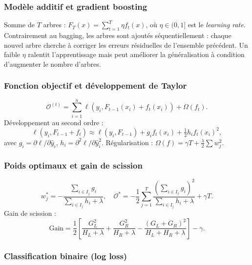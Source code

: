 \documentclass[12pt,a4paper]{report}
\begin{document}
\subsubsection{Modèle additif et gradient boosting}

Somme de $T$ arbres : $F_T(x)=\sum_{t=1}^{T}\eta f_t(x)$, où $\eta\in(0,1]$ est le
\emph{learning rate}. Contrairement au bagging, les arbres sont ajoutés séquentiellement :
chaque nouvel arbre cherche à corriger les erreurs résiduelles de l'ensemble précédent.
Un faible $\eta$ ralentit l'apprentissage mais peut améliorer la généralisation à condition
d'augmenter le nombre d'arbres.

\subsubsection{Fonction objectif et développement de Taylor}

\begin{equation}
 \mathcal{O}^{(t)} = \sum_{i=1}^n
 \ell(y_i, F_{t-1}(x_i) + f_t(x_i)) + \Omega(f_t).
\end{equation}
Développement au second ordre :
\begin{equation}
 \ell(y_i, F_{t-1} + f_t) \approx
 \ell(y_i, F_{t-1}) + g_i f_t(x_i) + \tfrac{1}{2} h_i f_t(x_i)^2,
\end{equation}
avec $g_i = \partial \ell/\partial \hat{y}_i$, $h_i = \partial^2 \ell/\partial \hat{y}_i^2$.
Régularisation : $\Omega(f) = \gamma T + \frac{\lambda}{2}\sum w_j^2$.

\subsubsection{Poids optimaux et gain de scission}

\begin{equation}
 w_j^* = -\frac{\sum_{i \in I_j} g_i}{\sum_{i \in I_j} h_i + \lambda}, \quad
 \mathcal{O}^* = -\frac{1}{2}\sum_{j=1}^T
 \frac{(\sum_{i \in I_j} g_i)^2}{\sum_{i \in I_j} h_i + \lambda} + \gamma T.
\end{equation}
Gain de scission :
\begin{equation}
 \text{Gain} = \frac{1}{2}\left[
 \frac{G_L^2}{H_L+\lambda} + \frac{G_R^2}{H_R+\lambda}
 - \frac{(G_L+G_R)^2}{H_L+H_R+\lambda} \right] - \gamma.
\end{equation}

\subsubsection{Classification binaire (log loss)}
\end{document}
